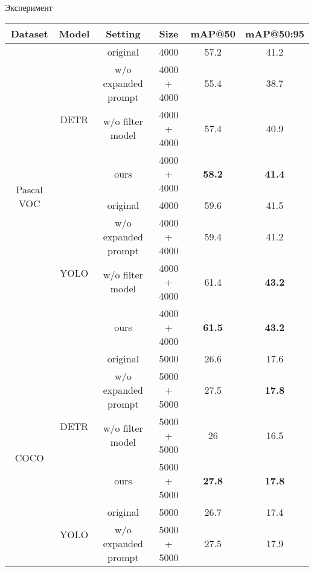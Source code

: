 \documentclass{beamer}
\begin{document}
\begin{frame}{Эксперимент}

\begin{table}[p]
\centering
\scriptsize %
\setlength{\tabcolsep}{2pt} %
\renewcommand{\arraystretch}{0.9} %
\begin{tabular}{cccc|cc}
\toprule
\textbf{Dataset} & \textbf{Model} & \textbf{Setting} & \textbf{Size} & \textbf{mAP@50} & \textbf{mAP@50:95} \\
\midrule
\multirow{8}{*}{Pascal VOC} 
    & \multirow{4}{*}{DETR}
        & original                     & 4000  & 57.2 & 41.2 \\
        &                              & w/o expanded prompt          & 4000 + 4000  & 55.4 & 38.7 \\
        &                              & w/o filter model             & 4000 + 4000  & 57.4 & 40.9 \\
        &                              & ours                          & 4000 + 4000  & \textbf{58.2} & \textbf{41.4} \\
    \cline{2-6}
    & \multirow{4}{*}{YOLO}
        & original                     & 4000  & 59.6 & 41.5 \\
        &                              & w/o expanded prompt          & 4000 + 4000  & 59.4 & 41.2 \\
        &                              & w/o filter model             & 4000 + 4000  & 61.4 & \textbf{43.2} \\
        &                              & ours                          & 4000 + 4000  & \textbf{61.5} & \textbf{43.2} \\
\midrule
\multirow{8}{*}{COCO} 
    & \multirow{4}{*}{DETR}
        & original                     & 5000 & 26.6 & 17.6 \\
        &                              & w/o expanded prompt          & 5000 + 5000 & 27.5 & \textbf{17.8} \\
        &                              & w/o filter model             & 5000 + 5000 & 26 & 16.5 \\
        &                              & ours                          & 5000 + 5000 & \textbf{27.8} & \textbf{17.8} \\
    \cline{2-6}
    & \multirow{4}{*}{YOLO}
        & original                     & 5000 & 26.7 & 17.4 \\
        &                              & w/o expanded prompt          & 5000 + 5000 & 27.5 & 17.9 \\

\end{tabular}
\end{table}
\end{frame}
\end{document}
